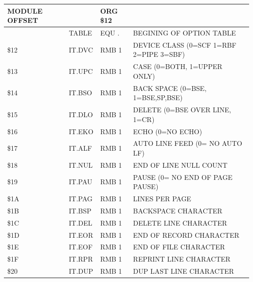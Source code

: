 \documentclass[
]{article}
\newcounter{none} %
\begin{document}
{\def\LTcaptype{none} %
\begin{longtable}[]{@{}
  >{\raggedright\arraybackslash}p{}
  >{\raggedright\arraybackslash}p{}
  >{\raggedright\arraybackslash}p{}
  >{\raggedright\arraybackslash}p{}@{}}
\toprule\noalign{}
\begin{minipage}[b]{\linewidth}\raggedright
MODULE OFFSET
\end{minipage} & \begin{minipage}[b]{\linewidth}\raggedright
\end{minipage} & \begin{minipage}[b]{\linewidth}\raggedright
ORG \$12
\end{minipage} & \begin{minipage}[b]{\linewidth}\raggedright
\end{minipage} \\
\midrule\noalign{}
\endhead
\bottomrule\noalign{}
\endlastfoot
& TABLE & EQU . & BEGINING OF OPTION TABLE \\
\$12 & IT.DVC & RMB 1 & DEVICE CLASS (0=SCF 1=RBF 2=PIPE 3=SBF) \\
\$13 & IT.UPC & RMB 1 & CASE (0=BOTH, 1=UPPER ONLY) \\
\$14 & IT.BSO & RMB 1 & BACK SPACE (0=BSE, 1=BSE,SP,BSE) \\
\$15 & IT.DLO & RMB 1 & DELETE (0=BSE OVER LINE, 1=CR) \\
\$16 & IT.EKO & RMB 1 & ECHO (0=NO ECHO) \\
\$17 & IT.ALF & RMB 1 & AUTO LINE FEED (0= NO AUTO LF) \\
\$18 & IT.NUL & RMB 1 & END OF LINE NULL COUNT \\
\$19 & IT.PAU & RMB 1 & PAUSE (0= NO END OF PAGE PAUSE) \\
\$1A & IT.PAG & RMB 1 & LINES PER PAGE \\
\$1B & IT.BSP & RMB 1 & BACKSPACE CHARACTER \\
\$1C & IT.DEL & RMB 1 & DELETE LINE CHARACTER \\
\$1D & IT.EOR & RMB 1 & END OF RECORD CHARACTER \\
\$1E & IT.EOF & RMB 1 & END OF FILE CHARACTER \\
\$1F & IT.RPR & RMB 1 & REPRINT LINE CHARACTER \\
\$20 & IT.DUP & RMB 1 & DUP LAST LINE CHARACTER \\

\end{longtable}}
\end{document}
